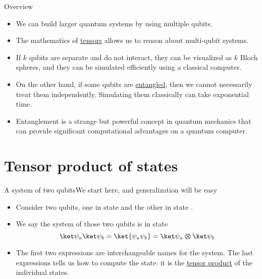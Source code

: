 
\begin{frame}{Overview}

\begin{itemize}
    \item We can build larger quantum systems by using multiple qubits.
    \item The mathematics of \href{https://en.wikipedia.org/wiki/Tensor}{tensors} allows us to reason about multi-qubit systems.
    \item If $k$ qubits are separate and do not interact, they can be visualized as $k$ Bloch spheres, and they can be simulated efficiently using a classical computer.
    \item On the other hand, if some qubits are \href{https://en.wikipedia.org/wiki/Quantum_entanglement}{entangled}, then we cannot necessarily treat them independently.  Simulating them classically can take exponential time.
    \item Entanglement is a strange but powerful concept in quantum mechanics that can provide significant computational advantages on a quantum computer.
\end{itemize}
    
\end{frame}

\section{Tensor product of states}

\begin{frame}{A system of two qubits}{We start here, and generalization will be easy}
\begin{itemize}
    \item Consider two qubits, one in state  and the other in state .
    \item We say the system of those two qubits is in state
    \[
       \QState{a}\QState{b} = \ket{\psi_{a}\psi_{b}} = \TensProd{\QState{a}}{\QState{b}}
    \]
    \item The first two expressions are interchangeable names for the system. The last expressions tells us how to compute the state:  it is the \href{https://en.wikipedia.org/wiki/Tensor_product}{tensor product} of the individual states.
\end{itemize}
\end{frame}


